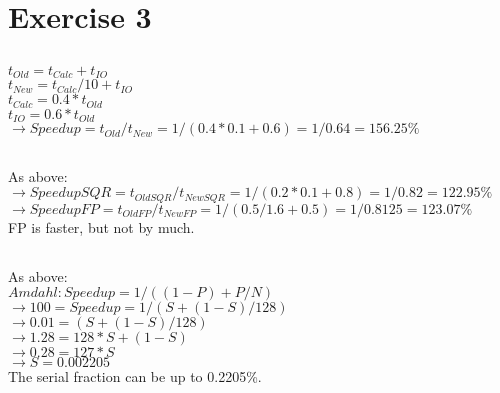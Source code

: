 \documentclass[12pt]{article}
\begin{document}
\section{Exercise 3}
\subsection{}
$t_{Old} = t_{Calc} + t_{IO}$ \\
$t_{New} = t_{Calc}/10 + t_{IO}$ \\
$t_{Calc} = 0.4*t_{Old}$ \\
$t_{IO} = 0.6 *t_{Old}$ \\
$ \rightarrow Speedup = t_{Old}/t_{New} = 1/(0.4*0.1 + 0.6) = 1/0.64 = 156.25\%$
\subsection{}
As above: \\
$ \rightarrow SpeedupSQR = t_{OldSQR}/t_{NewSQR} = 1/(0.2*0.1 + 0.8) = 1/0.82 = 122.95\%$ \\
$ \rightarrow SpeedupFP= t_{OldFP}/t_{NewFP} = 1/(0.5/1.6 + 0.5) = 1/0.8125 = 123.07\%$ \\
FP is faster, but not by much.
\subsection{}
As above: \\
$ Amdahl: Speedup = 1/((1-P) + P/N)$ \\
$ \rightarrow 100 = Speedup = 1/(S + (1-S)/128)$ \\
$ \rightarrow 0.01 = (S + (1-S)/128)$ \\
$ \rightarrow 1.28 = 128 *S + (1-S)$ \\
$ \rightarrow 0.28 = 127*S$ \\
$ \rightarrow S = 0.002205$ \\
The serial fraction can be up to 0.2205\%.
\end{document}
